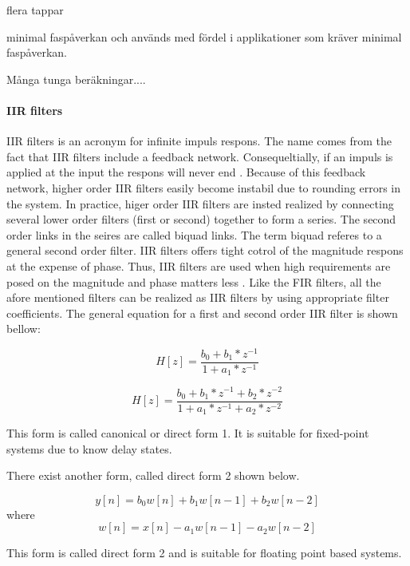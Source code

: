 \documentclass[12p]{article}
\begin{document}
flera tappar

minimal faspåverkan och används med fördel i applikationer som kräver minimal faspåverkan.

Många tunga beräkningar....


\paragraph{IIR filters}
IIR filters is an acronym for infinite impuls respons. The name comes from the fact that IIR filters include a feedback network. Consequeltially, if an impuls is applied at the input the respons will never end \cite{sven}. Because of this feedback network, higher order IIR filters easily become instabil due to rounding errors in the system. In practice, higer order IIR filters are insted realized by connecting several lower order filters (first or second) together to form a series. The second order links in the seires are called biquad links. The term biquad referes to a general second order filter. IIR filters offers tight cotrol of the magnitude respons at the expense of phase. Thus, IIR filters are used when high requirements are posed on the magnitude and phase matters less \cite{storn}. Like the FIR filters, all the afore mentioned filters can be realized as IIR filters by using appropriate filter coefficients. The general equation for a first and second order IIR filter is shown bellow: \\
\null

\begin{equation}
H[z] = \frac{b_0 + b_1*z^{-1}}{1+a_1*z^{-1}}
\end{equation}

\begin{equation}
H[z] = \frac{b_0 + b_1*z^{-1}+b_2*z^{-2}}{1+a_1*z^{-1}+a_2*z^{-2}}
\end{equation}

This form is called canonical or direct form 1. It is suitable for fixed-point systems due to know delay states.

There exist another form, called direct form 2 shown below.

\begin{equation}
 y[n]=b_{0}w[n]+b_{1}w[n-1]+b_{2}w[n-2]
\end{equation}
where
\begin{equation}
 w[n]=x[n]-a_{1}w[n-1]-a_{2}w[n-2]
\end{equation}  

This form is called direct form 2 and is suitable for floating point based systems.
\end{document}
